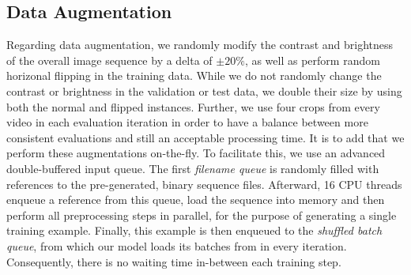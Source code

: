 \subsection{Data Augmentation}

Regarding data augmentation, we randomly modify the contrast and brightness of the overall image sequence by a delta of $ \pm20\% $, as well as perform random horizonal flipping in the training data. While we do not randomly change the contrast or brightness in the validation or test data, we double their size by using both the normal and flipped instances. Further, we use four crops from every video in each evaluation iteration in order to have a balance between more consistent evaluations and still an acceptable processing time. It is to add that we perform these augmentations on-the-fly. To facilitate this, we use an advanced double-buffered input queue. The first \textit{filename queue} is randomly filled with references to the pre-generated, binary sequence files. Afterward, \num{16} CPU threads enqueue a reference from this queue, load the sequence into memory and then perform all preprocessing steps in parallel, for the purpose of generating a single training example. Finally, this example is then enqueued to the \textit{shuffled batch queue}, from which our model loads its batches from in every iteration. Consequently, there is no waiting time in-between each training step.
